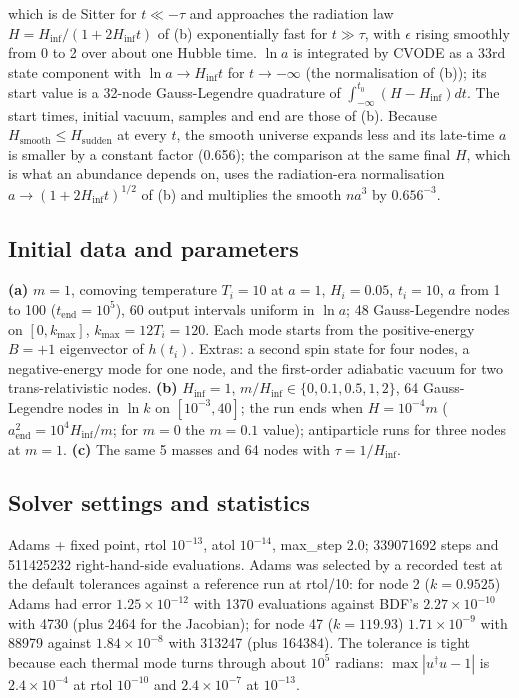 \documentclass[11pt]{article}
\begin{document}
which is de Sitter for $t\ll-\tau$ and approaches the radiation law $H=H_{\mathrm{inf}}/(1+2H_{\mathrm{inf}}t)$ of (b) exponentially fast for $t\gg\tau$, with $\epsilon$ rising smoothly from 0 to 2 over about one Hubble time. $\ln a$ is integrated by CVODE as a 33rd state component with $\ln a\to H_{\mathrm{inf}}t$ for $t\to-\infty$ (the normalisation of (b)); its start value is a 32-node Gauss-Legendre quadrature of $\int_{-\infty}^{t_0}(H-H_{\mathrm{inf}})dt$. The start times, initial vacuum, samples and end are those of (b). Because $H_{\mathrm{smooth}}\le H_{\mathrm{sudden}}$ at every $t$, the smooth universe expands less and its late-time $a$ is smaller by a constant factor (0.656); the comparison at the same final $H$, which is what an abundance depends on, uses the radiation-era normalisation $a\to(1+2H_{\mathrm{inf}}t)^{1/2}$ of (b) and multiplies the smooth $na^3$ by $0.656^{-3}$.

\subsection{Initial data and parameters}

\textbf{(a)} $m=1$, comoving temperature $T_i=10$ at $a=1$, $H_i=0.05$, $t_i=10$, $a$ from 1 to 100 ($t_{\mathrm{end}}=10^5$), 60 output intervals uniform in $\ln a$; 48 Gauss-Legendre nodes on $[0,k_{\max}]$, $k_{\max}=12T_i=120$. Each mode starts from the positive-energy $B=+1$ eigenvector of $h(t_i)$. Extras: a second spin state for four nodes, a negative-energy mode for one node, and the first-order adiabatic vacuum for two trans-relativistic nodes. \textbf{(b)} $H_{\mathrm{inf}}=1$, $m/H_{\mathrm{inf}}\in\{0,0.1,0.5,1,2\}$, 64 Gauss-Legendre nodes in $\ln k$ on $[10^{-3},40]$; the run ends when $H=10^{-4}m$ ($a_{\mathrm{end}}^2=10^4H_{\mathrm{inf}}/m$; for $m=0$ the $m=0.1$ value); antiparticle runs for three nodes at $m=1$. \textbf{(c)} The same 5 masses and 64 nodes with $\tau=1/H_{\mathrm{inf}}$.

\subsection{Solver settings and statistics}

Adams + fixed point, rtol $10^{-13}$, atol $10^{-14}$, max\_step 2.0; 339071692 steps and 511425232 right-hand-side evaluations. Adams was selected by a recorded test at the default tolerances against a reference run at rtol/10: for node 2 ($k=0.9525$) Adams had error $1.25\times10^{-12}$ with 1370 evaluations against BDF's $2.27\times10^{-10}$ with 4730 (plus 2464 for the Jacobian); for node 47 ($k=119.93$) $1.71\times10^{-9}$ with 88979 against $1.84\times10^{-8}$ with 313247 (plus 164384). The tolerance is tight because each thermal mode turns through about $10^5$ radians: $\max|u^\dagger u-1|$ is $2.4\times10^{-4}$ at rtol $10^{-10}$ and $2.4\times10^{-7}$ at $10^{-13}$.
\end{document}
